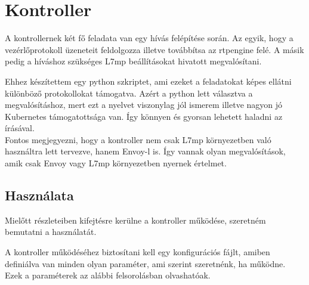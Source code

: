 \chapter{Kontroller}

A kontrollernek két fő feladata van egy hívás felépítése során. Az egyik, hogy
a vezérlőprotokoll üzeneteit feldolgozza illetve továbbítsa az rtpengine
felé. A másik pedig a híváshoz szükséges L7mp beállításokat hivatott 
megvalósítani.

Ehhez készítettem egy python szkriptet, ami ezeket a feladatokat képes ellátni
különböző protokollokat támogatva. Azért a python lett választva a megvalósításhoz,
mert ezt a nyelvet viszonylag jól ismerem illetve nagyon jó Kubernetes 
támogatottsága van. Így könnyen és gyorsan lehetett haladni az írásával. \\

Fontos megjegyezni, hogy a kontroller nem csak L7mp környezetben való használtra lett
tervezve, hanem Envoy-l is. Így vannak olyan megvalósítások, amik csak Envoy
vagy L7mp környezetben nyernek értelmet. 

\section{Használata}

Mielőtt részleteiben kifejtésre kerülne a kontroller működése, szeretném bemutatni a
használatát.

A kontroller működéséhez biztosítani kell egy konfigurációs fájlt, amiben definiálva
van minden olyan paraméter, ami szerint szeretnénk, ha működne. Ezek a paraméterek
az alábbi felsorolásban olvashatóak.


